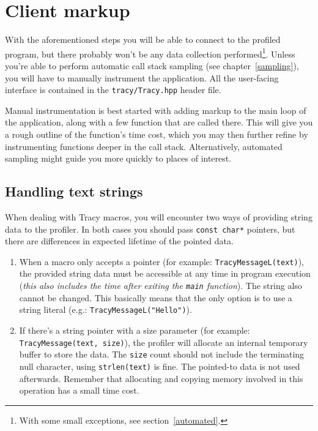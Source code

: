 \documentclass[hidelinks,titlepage,a4paper]{article}
\begin{document}
\section{Client markup}
\label{client}

With the aforementioned steps you will be able to connect to the profiled program, but there probably won't be any data collection performed\footnote{With some small exceptions, see section~\ref{automated}.}. Unless you're able to perform automatic call stack sampling (see chapter~\ref{sampling}), you will have to manually instrument the application. All the user-facing interface is contained in the \texttt{tracy/Tracy.hpp} header file.

Manual instrumentation is best started with adding markup to the main loop of the application, along with a few function that are called there. This will give you a rough outline of the function's time cost, which you may then further refine by instrumenting functions deeper in the call stack. Alternatively, automated sampling might guide you more quickly to places of interest.

\subsection{Handling text strings}
\label{textstrings}

When dealing with Tracy macros, you will encounter two ways of providing string data to the profiler. In both cases you should pass \texttt{const char*} pointers, but there are differences in expected lifetime of the pointed data.

\begin{enumerate}
\item When a macro only accepts a pointer (for example: \texttt{TracyMessageL(text)}), the provided string data must be accessible at any time in program execution (\emph{this also includes the time after exiting the \texttt{main} function}). The string also cannot be changed. This basically means that the only option is to use a string literal (e.g.: \texttt{TracyMessageL("Hello")}).

\item If there's a string pointer with a size parameter (for example: \texttt{TracyMessage(text, size)}), the profiler will allocate an internal temporary buffer to store the data. The \texttt{size} count should not include the terminating null character, using \texttt{strlen(text)} is fine. The pointed-to data is not used afterwards. Remember that allocating and copying memory involved in this operation has a small time cost.
\end{enumerate}
\end{document}
